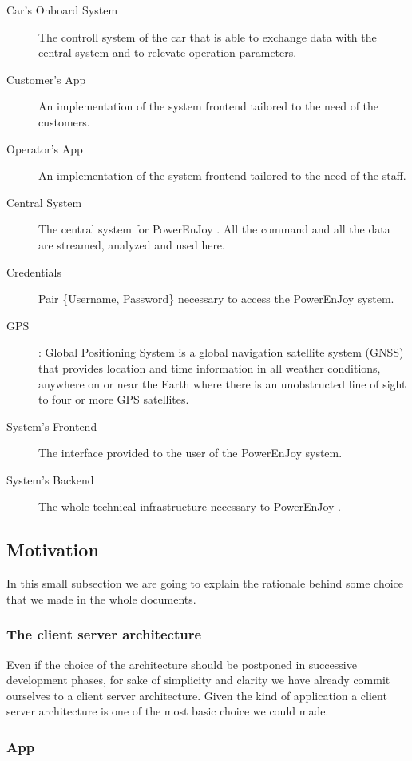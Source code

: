 \documentclass[11pt]{article} %
\newcommand{\pe}{PowerEnJoy }
\begin{document}
\begin{description}
	\item[Car's Onboard System] The controll system of the car that is able to exchange data with the central system and to relevate operation parameters.
	\item[Customer's App] An implementation of the system frontend tailored to the need of the customers.
	\item[Operator's App] An implementation of the system frontend tailored to the need of the staff.
	\item[Central System] The central system for \pe. All the command and all the data are streamed, analyzed and used here.
	\item[Credentials] Pair \{Username, Password\} necessary to access the \pe system.
  	\item[GPS]: Global Positioning System is a global navigation satellite system (GNSS) that provides location and time information in all weather conditions, anywhere on or near the Earth where there is an unobstructed line of sight to four or more GPS satellites.
  	\item[System's Frontend] The interface provided to the user of the \pe system. 
  	\item[System's Backend]  The whole technical infrastructure necessary to \pe.
  \end{description}

\subsection{Motivation}

In this small subsection we are going to explain the rationale behind some choice that we made in the whole documents.

\subsubsection{The client server architecture}

Even if the choice of the architecture should be postponed in successive development phases, for sake of simplicity and clarity we have already commit ourselves to a client server architecture.
Given the kind of application a client server architecture is one of the most basic choice we could made.

\subsubsection{App}
\end{document}
